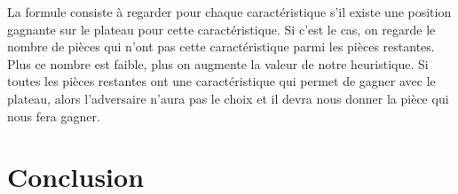 \documentclass{article}
\begin{document}
La formule consiste à regarder pour chaque caractéristique s’il existe
une position gagnante sur le plateau pour cette caractéristique. Si
c'est le cas, on regarde le nombre de pièces qui n'ont pas cette
caractéristique parmi les pièces restantes. Plus ce nombre est
faible, plus on augmente la valeur de notre heuristique.
Si toutes les pièces restantes ont une caractéristique qui permet
de gagner avec le
plateau, alors l'adversaire n'aura pas le choix et il devra nous
donner la pièce qui nous fera gagner.

\section{Conclusion}
\end{document}
